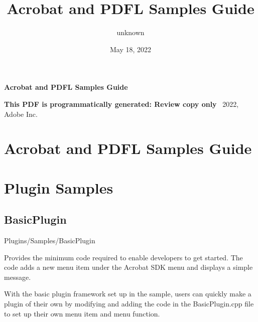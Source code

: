 \documentclass[letterpaper,12pt,english,openany,oneside]{sphinxmanual}
\title{Acrobat and PDFL Samples Guide}
\date{May 18, 2022}
\author{unknown}
\begin{document}
\pagestyle{empty}

    \begin{titlepage}
        \begin{figure}[h]
        \end{figure}
        \centering
        \vspace*{40mm}
        \textbf{\Huge Acrobat and PDFL Samples Guide}

        \vspace{15mm}
        \Large \textbf{{This PDF is programmatically generated: Review copy only}}
        \vfill
        \small \textcopyright\ 2022, Adobe Inc.
    \end{titlepage}
    \clearpage
    \tableofcontents
    \clearpage
    
\pagestyle{plain}

\pagestyle{normal}
\label{\detokenize{toc::doc}}





\chapter{Acrobat and PDFL Samples Guide}
\label{\detokenize{index:acrobat-and-pdfl-samples-guide}}\label{\detokenize{index::doc}}

\chapter{Plugin Samples}
\label{\detokenize{Samples_Plug_in:plugin-samples}}\label{\detokenize{Samples_Plug_in::doc}}

\section{BasicPlugin}
\label{\detokenize{Samples_Plug_in:basicplugin}}

Plugins/Samples/BasicPlugin


Provides the minimum code required to enable developers to get started. The code adds a new menu item under the Acrobat SDK menu and displays a simple message.

With the basic plugin framework set up in the sample, users can quickly make a plugin of their own by modifying and adding the code in the BasicPlugin.cpp file to set up their own menu item and menu function.
\end{document}
